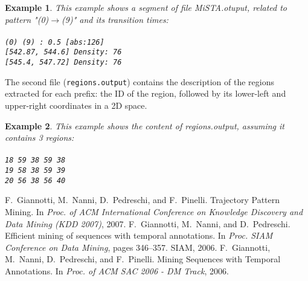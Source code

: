 \documentclass[12pt]{article}
\newtheorem{example}{Example}
\begin{document}
\begin{example}
This example shows a segment of file MiSTA.otuput, related to pattern "(0)$\rightarrow$(9)" and its transition times:
\\ \\
\texttt{(0) (9) : 0.5		[abs:126]} \\
\texttt{[542.87,  544.6] Density: 76} \\
\texttt{[545.4, 547.72] Density: 76}\\

\end{example}

The second file (\texttt{regions.output}) contains the description of the regions extracted for each prefix: the ID of the region, followed by its lower-left and upper-right coordinates in a 2D space.

\begin{example}
This example shows the content of regions.output, assuming it contains 3 regions:
\\ \\ 
\texttt{18  59 38 59 38}\\
\texttt{19 58 38 59 39}\\
\texttt{20 56 38 56 40}\\
\end{example}


\begin{thebibliography}{10}

F.~Giannotti, M.~Nanni, D.~Pedreschi, and F.~Pinelli.
\newblock Trajectory Pattern Mining.
\newblock In {\em Proc. of ACM International Conference on Knowledge Discovery and Data Mining (KDD 2007)}, 2007.
F.~Giannotti, M.~Nanni, and D.~Pedreschi.
\newblock Efficient mining of sequences with temporal annotations.
\newblock In {\em Proc. SIAM Conference on Data Mining}, pages 346--357. SIAM,
  2006.
F.~Giannotti, M.~Nanni, D.~Pedreschi, and F.~Pinelli.
\newblock Mining Sequences with Temporal Annotations.
\newblock In {\em Proc. of ACM SAC 2006 - DM Track}, 2006.

\end{thebibliography}
\end{document}
